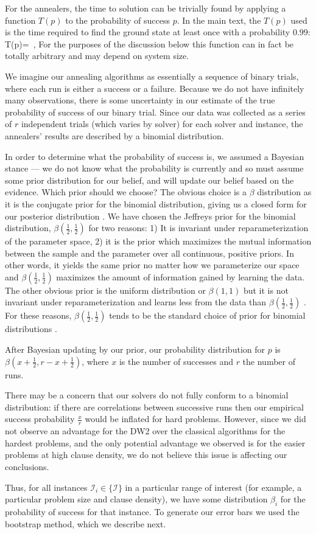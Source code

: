 For the annealers, the time to solution can be trivially found by applying a function $T(p)$ to the probability of success $p$. In the main text, the $T(p)$ used is the time required to find the ground state at least once with a probability $0.99$:
%
\beq
T(p)=\ ,
\eeq
%
For the purposes of the discussion below this function can in fact be totally arbitrary and may depend on system size.

We imagine our annealing algorithms as essentially a sequence of binary trials, where each run is either a success or a failure. Because we do not have infinitely many observations, there is some uncertainty in our estimate of the true probability of success of our binary trial. Since our data was collected as a series of $r$ independent trials (which varies by solver) for each solver and instance, the annealers' results are described by a binomial distribution.

In order to determine what the probability of success is, we assumed a Bayesian stance --- we do not know what the probability is currently and so must assume some prior distribution for our belief, and will update our belief based on the evidence. Which prior should we choose? The obvious choice is a $\beta$ distribution as it is the conjugate prior for the binomial distribution, giving us a closed form for our posterior distribution \cite{fink:97}. We have chosen the Jeffreys prior for the binomial distribution, $\beta(\frac12,\frac12)$ for two reasons: 1) It is invariant under reparameterization of the parameter space, 2) it is the prior which maximizes the mutual information between the sample and the parameter over all continuous, positive priors. In other words, it yields the same prior no matter how we parameterize our space and $\beta(\frac12,\frac12)$ maximizes the amount of information gained by learning the data. The other obvious prior is the uniform distribution or $\beta(1,1)$ but it is not invariant under reparameterization and learns less from the data than $\beta(\frac12,\frac12)$ \cite{clarke:94}. For these reasons, $\beta(\frac12,\frac12)$ tends to be the standard choice of prior for binomial distributions \cite{bernardo:11}.

After Bayesian updating by our prior, our probability distribution for $p$ is $\beta(x+\frac12,r-x+\frac12)$, where $x$ is the number of successes and $r$ the number of runs.

There may be a concern that our solvers do not fully conform to a binomial distribution: if there are correlations between successive runs then our empirical success probability $\frac xr$ would be inflated for hard problems. However, since we did not observe an advantage for the DW2 over the classical algorithms for the hardest problems, and the only potential advantage we observed is for the easier problems at high clause density, we do not believe this issue is affecting our conclusions.

Thus, for all instances $\mathcal{I}_i \in \{\mathcal{I}\}$ in a particular range of interest (for example, a particular problem size and clause density), we have some distribution $\beta_i$ for the probability of success for that instance. To generate our error bars we used the bootstrap method, which we describe next.
